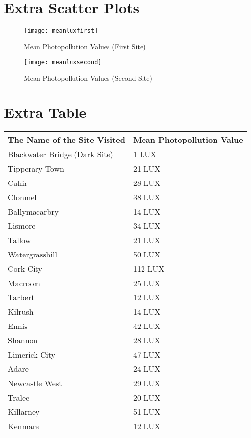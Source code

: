 \begin{appendix}
\section*{Extra Scatter Plots}
\begin{figure}[H]
    \centering
    \texttt{[image: meanluxfirst]}
    \caption{Mean Photopollution Values (First Site)}
    \label{meanluxfirst}
\end{figure}
\begin{figure}[H]
    \centering
    \texttt{[image: meanluxsecond]}
    \caption{Mean Photopollution Values (Second Site)}
    \label{meanluxsecond}
\end{figure}

\newpage

\section*{Extra Table}
\begin{tabularx}{\textwidth}{|X|l|}
  \hline
  \textbf{The Name of the Site Visited} & \textbf{Mean Photopollution Value} \\ [15pt]
\hline
Blackwater Bridge (Dark Site) & 1 LUX \\ [15pt]
\hline
Tipperary Town & 21 LUX \\ [15pt]
\hline
Cahir & 28 LUX \\ [15pt]
\hline
Clonmel & 38 LUX \\ [15pt]
\hline
Ballymacarbry & 14 LUX \\ [15pt]
\hline
Lismore & 34 LUX \\ [15pt]
\hline
Tallow & 21 LUX \\ [15pt]
\hline
Watergrasshill & 50 LUX \\ [15pt]
\hline
Cork City & 112 LUX \\ [15pt]
\hline
Macroom & 25 LUX \\ [15pt]
\hline
Tarbert & 12 LUX \\ [15pt]
\hline
Kilrush & 14 LUX \\ [15pt]
\hline
Ennis & 42 LUX \\ [15pt]
\hline
Shannon & 28 LUX \\ [15pt]
\hline
Limerick City & 47 LUX \\ [15pt]
\hline
Adare & 24 LUX \\ [15pt]
\hline
Newcastle West & 29 LUX \\ [15pt]
\hline
Tralee & 20 LUX \\ [15pt]
\hline
Killarney & 51 LUX \\ [15pt]
\hline
Kenmare & 12 LUX \\ [15pt]
\hline
\end{tabularx}


\end{appendix}
